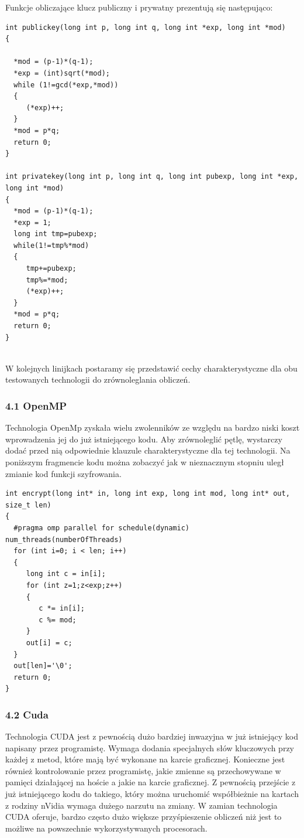 \documentclass[a4paper,12pt]{article}
\begin{document}
Funkcje obliczające klucz publiczny i prywatny prezentują się następująco:
\begin{lstlisting}
int publickey(long int p, long int q, long int *exp, long int *mod)
{

  *mod = (p-1)*(q-1);
  *exp = (int)sqrt(*mod);
  while (1!=gcd(*exp,*mod)) 
  {
     (*exp)++;
  }
  *mod = p*q;
  return 0;
}

int privatekey(long int p, long int q, long int pubexp, long int *exp, long int *mod)
{
  *mod = (p-1)*(q-1);
  *exp = 1;
  long int tmp=pubexp;
  while(1!=tmp%*mod)
  {
     tmp+=pubexp;
     tmp%=*mod;
     (*exp)++;
  }
  *mod = p*q;
  return 0;
}


\end{lstlisting}
W kolejnych linijkach postaramy się przedstawić cechy charakterystyczne dla obu testowanych technologii do zrównoleglania obliczeń.

\subsubsection*{4.1 OpenMP}

Technologia OpenMp zyskała wielu zwolenników ze względu na bardzo niski koszt wprowadzenia jej do już istniejącego kodu. Aby zrównoleglić pętlę, wystarczy dodać przed nią odpowiednie klauzule charakterystyczne dla tej technologii. Na poniższym fragmencie kodu można zobaczyć jak w nieznacznym stopniu uległ zmianie kod funkcji szyfrowania.


\begin{lstlisting}
int encrypt(long int* in, long int exp, long int mod, long int* out, size_t len)
{
  #pragma omp parallel for schedule(dynamic) num_threads(numberOfThreads)
  for (int i=0; i < len; i++)
  {
     long int c = in[i];
     for (int z=1;z<exp;z++)
     {
        c *= in[i];
        c %= mod;
     }
     out[i] = c;
  }
  out[len]='\0';
  return 0;
}

\end{lstlisting}


\subsubsection*{4.2 Cuda}

Technologia CUDA jest z pewnością dużo bardziej inwazyjna w już istniejący kod napisany przez programistę. Wymaga dodania specjalnych słów kluczowych przy każdej z metod, które mają być wykonane na karcie graficznej. Konieczne jest również kontrolowanie przez programistę, jakie zmienne są przechowywane w pamięci działającej na hoście a jakie na karcie graficznej. Z pewnością przejście z już istniejącego kodu do takiego, który można uruchomić współbieżnie na kartach z rodziny nVidia wymaga dużego narzutu na zmiany. W zamian technologia CUDA oferuje, bardzo często dużo większe przyśpieszenie obliczeń niż jest to możliwe na powszechnie wykorzystywanych procesorach.
\end{document}
